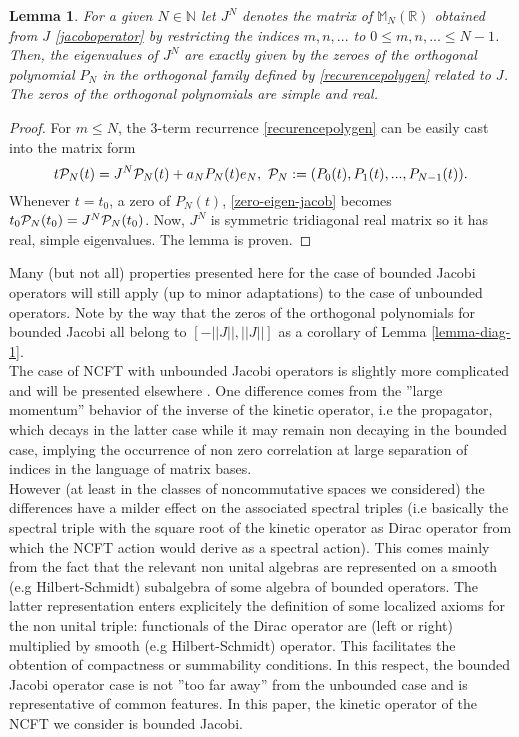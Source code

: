 \documentclass[a4paper]{jpconf}
\numberwithin{equation}{section}
\newtheorem{lemma}[Theorem]{Lemma}
\theoremstyle{nonumberplain}
\newtheorem{proof}{Proof}
\begin{document}
\begin{lemma}\label{lemma-spectral}
For a given $N\in\mathbb{N}$ let $J^N$ denotes the matrix of $\mathbb{M}_N(\mathbb{R})$ obtained from $J$ \eqref{jacoboperator} by restricting the indices $m,n,...$ to $0\le m,n,...\le N-1$. Then, the eigenvalues of $J^N$ are exactly given by the zeroes of the orthogonal polynomial $P_N$ in the orthogonal family defined by \eqref{recurencepolygen} related to $J$. The zeros of the orthogonal polynomials are simple and real.
\end{lemma}\label{lemma-diag-1}
\begin{proof}
For $m\le N$, the 3-term recurrence \eqref{recurencepolygen} can be easily cast into the matrix form 
\begin{equation}
t{\cal{P}}_N(t)=J^N{\cal{P}}_N(t)+a_NP_N(t)e_N,\ {\cal{P}}_N:=(P_0(t),P_1(t),...,P_{N-1}(t))\label{zero-eigen-jacob}.
\end{equation}
Whenever $t=t_0$, a zero of $P_N(t)$, \eqref{zero-eigen-jacob} becomes $t_0{\cal{P}}_N(t_0)=J^N{\cal{P}}_N(t_0)$. Now, $J^N$ is symmetric tridiagonal real matrix so it has real, simple eigenvalues. The lemma is proven.
\end{proof}
Many (but not all) properties presented here for the case of bounded Jacobi operators will still apply (up to minor adaptations) to the case of unbounded operators. Note by the way that the zeros of the orthogonal polynomials for bounded Jacobi all belong to $[-||J||,||J||]$ as a corollary of Lemma \ref{lemma-diag-1}.\\
The case of NCFT with unbounded Jacobi operators is slightly more complicated and will be presented elsewhere \cite{unboud-jac}. One difference comes from the ''large momentum'' behavior of the inverse of the kinetic operator, i.e the propagator, which decays in the latter case while it may remain non decaying in the bounded case, implying the occurrence of non zero correlation at large separation of indices in the language of matrix bases.\\
However (at least in the classes of noncommutative spaces we considered) the differences have a milder effect on the associated spectral triples (i.e basically the spectral triple with the square root of the kinetic operator as Dirac operator from which the NCFT action would derive as a spectral action). This comes mainly from the fact that the relevant non unital algebras are represented on a smooth (e.g Hilbert-Schmidt) subalgebra of some algebra of bounded operators. The latter representation enters explicitely the definition of some localized axioms for the non unital triple: functionals of the Dirac operator are (left or right) multiplied by smooth (e.g Hilbert-Schmidt) operator. This facilitates the obtention of compactness or summability conditions. In this respect, the bounded Jacobi operator case is not ''too far away'' from the unbounded case and is representative of common features. In this paper, the kinetic operator of the NCFT we consider is bounded Jacobi.\par
\end{document}
